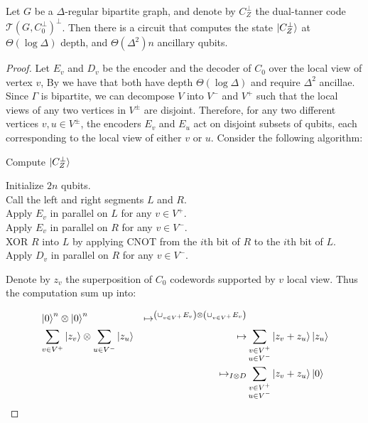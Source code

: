 \documentclass[manuscript,screen,review]{acmart}
\begin{document}
\begin{claim} 
  Let $G$ be a $\Delta$-regular bipartite graph, and denote by $C_{Z}^{\perp}$ the dual-tanner code $\mathcal{T}(G,C^{\perp}_{0})^\perp$. Then there is a circuit that computes the state $\ket{C_{Z}^{\perp}}$ at $\Theta(\log \Delta)$ depth, and $\Theta(\Delta^{2})n$ ancillary qubits.
\end{claim}


\begin{proof}
  Let $E_{v}$ and $D_{v}$ be the encoder and the decoder of $C_{0}$ over the local view of vertex $v$, By \cite{moore1998parallel} we have that both have  depth $\Theta(\log \Delta)$ and require $\Delta^{2}$ ancillae. 
  Since $\Gamma$ is bipartite, we can decompose $V$ into $V^{-}$ and $V^{+}$ such that the local views of any two vertices in $V^{\pm}$ are disjoint. Therefore, for any two different vertices $v,u \in V^{\pm}$, the encoders $E_v$ and $E_u$ act on disjoint subsets of qubits, each corresponding to the local view of either $v$ or $u$. Consider the following algorithm:

  \begin{algorithm}
    \caption{ Compute $\ket{C_{Z}^{\perp}}$ }
      \label{alg:computeCZ}
    Initialize $2n$ qubits. \\
    Call the left and right segments $L$ and $R$. \\
    Apply $E_{v}$ in parallel on $L$ for any $v \in V^{+}$. \\
    Apply $E_{v}$ in parallel on $R$ for any $v \in V^{-}$. \\
    XOR $R$ into $L$ by applying CNOT from the $i$th bit of $R$ to the $i$th bit of $L$. \\
    Apply $D_{v}$ in parallel on $R$ for any $v \in V^{-}$.
  \end{algorithm} 

  Denote by $z_{v}$ the superposition of $C_{0}$ codewords supported by $v$ local view. Thus the computation sum up into:  

  \begin{align*}
  &       \ket{0}^{n} \otimes \ket{0}^n & \mapsto^{ \left(\cup_{v \in V^{+}}E_{v}\right) \otimes \left( \cup_{v \in V^{+}}E_{v}\right)} & \\
&       \sum_{v \in V^{+}}\ket{z_{v}} \otimes \sum_{u\in V^{-}}{\ket{z_{u}}} & \mapsto & \sum_{\substack{v \in V^{+} \\ u \in V^{-}}}\ket{z_{v} + z_{u}} {\ket{z_{u}}}\\
&         & \mapsto_{I \otimes D} & \sum_{\substack{v \in V^{+} \\ u \in V^{-}}}\ket{z_{v} + z_{u}}\ket{0}
    \end{align*}
\end{proof}
\end{document}

